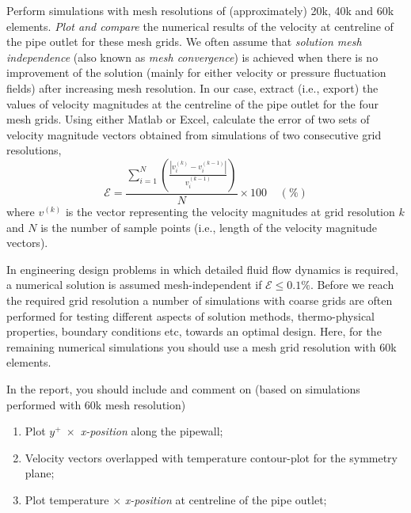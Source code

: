 \documentclass[12pts,a4paper,amsmath,amssymb,floatfix]{article}%
\begin{document}
     
    \begin{shaded}
    Perform simulations with mesh resolutions of (approximately) 20k, 40k and 60k elements. \emph{Plot and compare} the numerical results of the velocity at centreline of the pipe outlet for these mesh grids. We often assume that \emph{solution mesh independence} (also known as \emph{mesh convergence}) is achieved when there is no improvement of the solution (mainly for either velocity or pressure fluctuation fields)  after increasing mesh resolution. In our case, extract (i.e., export)  the values of velocity magnitudes at the centreline of the pipe outlet for the four mesh grids. Using either Matlab or Excel, calculate the error of two sets of velocity magnitude vectors obtained from simulations of two consecutive grid resolutions, 
        \begin{displaymath}
           \mathcal{E} = \frac{\sum\limits_{i=1}^{N}\left(\frac{\left|v_{i}^{(k)}-v_{i}^{(k-1)}\right|}{v_{i}^{(k-1)}}\right)}{N}\times 100\;\;\;\;\left(\%\right)
        \end{displaymath}
        where $v^{(k)}$ is the vector representing the velocity magnitudes at grid resolution $k$ and $N$ is the number of sample points (i.e., length of the velocity magnitude vectors). 
        \medskip
        
        In engineering design problems in which detailed fluid flow dynamics is required, a numerical solution is assumed mesh-independent if $\mathcal{E} \le 0.1\%$. Before we reach the required grid resolution a number of simulations with coarse grids are often performed for testing different aspects of solution methods, thermo-physical properties, boundary conditions etc, towards an optimal design. Here, for the remaining numerical simulations you should use a mesh grid resolution with 60k elements.
        \medskip
        
        In the report, you should include and comment on (based on simulations performed with 60k mesh resolution)
    \begin{enumerate}
        \item Plot $y^{+}\;\times$ {\it x-position} along the pipewall;
        \item Velocity vectors overlapped with temperature contour-plot for the symmetry plane;
        \item Plot temperature $\times$ {\it x-position} at centreline of the pipe outlet;
    \end{enumerate}
    \end{shaded}
    
\end{document}
